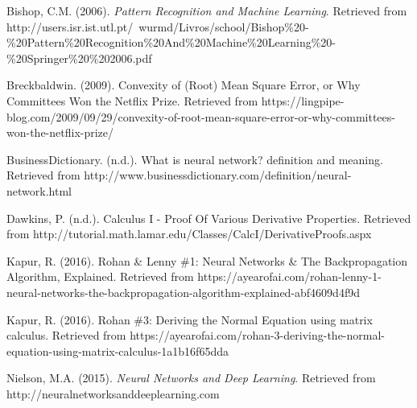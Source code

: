 \documentclass[a4paper,12pt]{article}
\begin{document}
\begin{thebibliography}{9}
Bishop, C.M. (2006). \textit{Pattern Recognition and Machine Learning}. Retrieved from http://users.isr.ist.utl.pt/~wurmd/Livros/school/Bishop\%20-\%20Pattern\%20Recognition\%20And\%20Machine\%20Learning\%20-\%20Springer\%20\%202006.pdf

Breckbaldwin. (2009). Convexity of (Root) Mean Square Error, or Why Committees Won the Netflix Prize. Retrieved from https://lingpipe-blog.com/2009/09/29/convexity-of-root-mean-square-error-or-why-committees-won-the-netflix-prize/

BusinessDictionary. (n.d.). What is neural network? definition and meaning. Retrieved from http://www.businessdictionary.com/definition/neural-network.html

Dawkins, P. (n.d.). Calculus I - Proof Of Various Derivative Properties. Retrieved from http://tutorial.math.lamar.edu/Classes/CalcI/DerivativeProofs.aspx

Kapur, R. (2016). Rohan \& Lenny \#1: Neural Networks \& The Backpropagation Algorithm, Explained. Retrieved from https://ayearofai.com/rohan-lenny-1-neural-networks-the-backpropagation-algorithm-explained-abf4609d4f9d

Kapur, R. (2016). Rohan \#3: Deriving the Normal Equation using matrix calculus. Retrieved from https://ayearofai.com/rohan-3-deriving-the-normal-equation-using-matrix-calculus-1a1b16f65dda

Nielson, M.A. (2015). \textit{Neural Networks and Deep Learning}. Retrieved from http://neuralnetworksanddeeplearning.com



\end{thebibliography}
\end{document}
